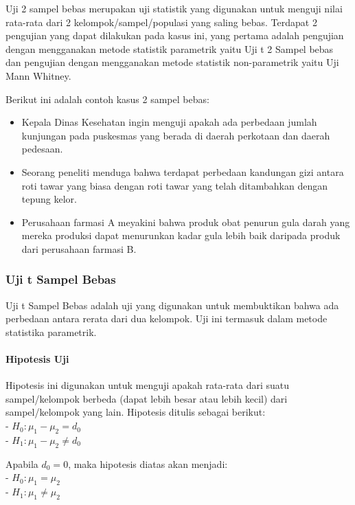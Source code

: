 \documentclass[
]{book}
\providecommand{\tightlist}{%
  \setlength{\itemsep}{0pt}\setlength{\parskip}{0pt}}
\begin{document}
Uji 2 sampel bebas merupakan uji statistik yang digunakan untuk menguji nilai rata-rata dari 2 kelompok/sampel/populasi yang saling bebas. Terdapat 2 pengujian yang dapat dilakukan pada kasus ini, yang pertama adalah pengujian dengan mengganakan metode statistik parametrik yaitu Uji t 2 Sampel bebas dan pengujian dengan mengganakan metode statistik non-parametrik yaitu Uji Mann Whitney.

Berikut ini adalah contoh kasus 2 sampel bebas:

\begin{itemize}
\tightlist
\item
  Kepala Dinas Kesehatan ingin menguji apakah ada perbedaan jumlah kunjungan pada puskesmas yang berada di daerah perkotaan dan daerah pedesaan.
\item
  Seorang peneliti menduga bahwa terdapat perbedaan kandungan gizi antara roti tawar yang biasa dengan roti tawar yang telah ditambahkan dengan tepung kelor.
\item
  Perusahaan farmasi A meyakini bahwa produk obat penurun gula darah yang mereka produksi dapat menurunkan kadar gula lebih baik daripada produk dari perusahaan farmasi B.
\end{itemize}

\hypertarget{uji-t-sampel-bebas}{%
\subsubsection{Uji t Sampel Bebas}\label{uji-t-sampel-bebas}}

Uji t Sampel Bebas adalah uji yang digunakan untuk membuktikan bahwa ada perbedaan antara rerata dari dua kelompok. Uji ini termasuk dalam metode statistika parametrik.

\hypertarget{a3-hipotesis-t-bebas}{%
\paragraph{Hipotesis Uji}\label{a3-hipotesis-t-bebas}}

Hipotesis ini digunakan untuk menguji apakah rata-rata dari suatu sampel/kelompok berbeda (dapat lebih besar atau lebih kecil) dari sampel/kelompok yang lain. Hipotesis ditulis sebagai berikut:\\
- \(H_0 : \mu_1-\mu_2 = d_0\)\\
- \(H_1 : \mu_1-\mu_2 \neq d_0\)

Apabila \(d_0 = 0\), maka hipotesis diatas akan menjadi:\\
- \(H_0 : \mu_1 = \mu_2\)\\
- \(H_1 : \mu_1 \neq \mu_2\)
\end{document}
